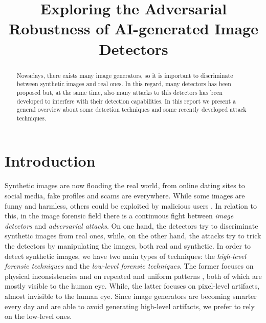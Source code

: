 \documentclass[conference]{IEEEtran} %
\begin{document}

\title{Exploring the Adversarial Robustness of AI-generated Image Detectors}

\author{
}

\maketitle

\begin{abstract}
    Nowadays, there exists many image generators, so it is important to discriminate between synthetic images and real ones. In this regard, many detectors has been proposed but, at the same time, also many attacks to this detectors has been developed to interfere with their detection capabilities. In this report we present a general overview about some detection techniques and some recently developed attack techniques. 
\end{abstract}

\section{Introduction}
    Synthetic images are now flooding the real world, from online dating sites to social media, fake profiles and scams are everywhere. While some images are funny and harmless, others could be exploited by malicious users \cite{carlini2020evading}. In relation to this, in the image forensic field there is a continuous fight between \textit{image detectors} and \textit{adversarial attacks}. On one hand, the detectors try to discriminate synthetic images from real ones, while, on the other hand, the attacks try to trick the detectors by manipulating the images, both real and synthetic. In order to detect synthetic images, we have two main types of techniques: the \textit{high-level forensic techniques} and the \textit{low-level forensic techniques}. The former focuses on physical inconsistencies \cite{farid2022lighting}\cite{farid2022perspective} and on repeated and uniform patterns \cite{mundra2023exposing}, both of which are mostly visible to the human eye. While, the latter focuses on pixel-level artifacts, almost invisible to the human eye. Since image generators are becoming smarter every day and are able to avoid generating high-level artifacts, we prefer to rely on the low-level ones.
\end{document}
